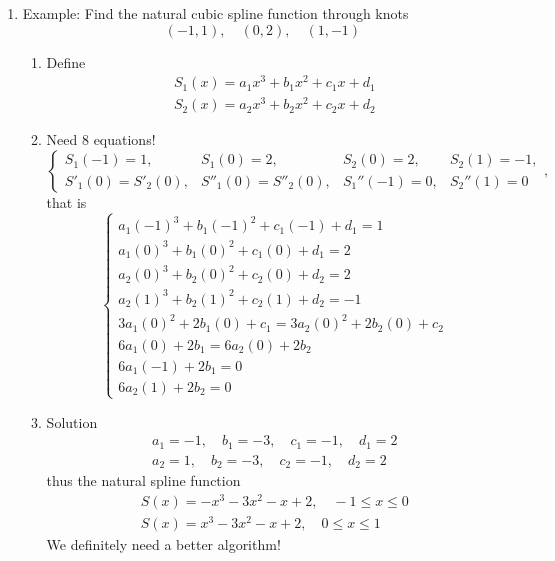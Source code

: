 \documentclass{article}
\theoremstyle{remark}
\begin{document}
\begin{enumerate}
\item Example: Find the natural cubic spline function through knots
$$
(-1,1),\quad (0,2), \quad (1,-1)
$$
\begin{enumerate}
\item Define
\begin{eqnarray*}
S_1(x) = a_1x^3+ b_1x^2 + c_1x + d_1\\
S_2(x) = a_2x^3+ b_2x^2 + c_2x + d_2
\end{eqnarray*}
\item Need 8 equations!
$$
\left\{
\begin{array}{llll}
S_1(-1) = 1, &  
S_1(0) = 2, & 
S_2(0) = 2, & 
S_2(1) = -1,\\
S'_1(0) = S'_2(0), & 
S''_1(0) = S''_2(0), &
S_1''(-1) = 0, & 
S_2''(1) = 0
\end{array}
\right.,\quad$$
that is 
$$
\left\{
\begin{array}{l}
 a_1(-1)^3+ b_1(-1)^2 + c_1(-1) + d_1 = 1\\
a_1(0)^3+ b_1(0)^2 + c_1(0) + d_1  = 2\\
a_2(0)^3+ b_2(0)^2 + c_2(0) + d_2 = 2\\
a_2(1)^3+ b_2(1)^2 + c_2(1) + d_2 = -1\\
3a_1(0)^2 + 2b_1(0) + c_1 = 3a_2(0)^2 + 2b_2(0) + c_2\\
6a_1(0)+ 2b_1 = 6a_2(0)+ 2b_2\\
6a_1(-1) + 2b_1  = 0\\
6a_2(1) + 2b_2 = 0
\end{array}
\right.
$$
\item Solution
\begin{eqnarray*}
a_1 = -1,\quad b_1 = -3, \quad c_1 = -1, \quad d_1 = 2\\
a_2 = 1, \quad b_2 = -3, \quad c_2 = -1, \quad d_2 = 2
\end{eqnarray*}
thus the natural spline function
\begin{eqnarray*}
S(x) = -x^3-3x^2-x+2,\quad -1\leq x\leq 0\\
S(x) = x^3-3x^2-x+2,\quad 0\leq x\leq 1
\end{eqnarray*}
We definitely need a better algorithm!
\end{enumerate}



\end{enumerate}
\end{document}
